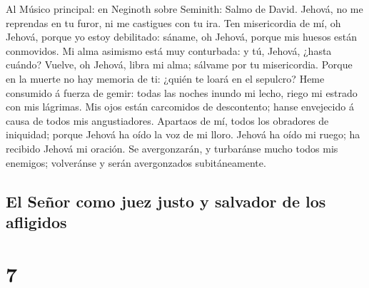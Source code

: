  Al Músico principal: en Neginoth sobre Seminith: Salmo de
David. Jehová, no me reprendas en tu furor, ni me castigues con tu ira.
 Ten misericordia de mí, oh Jehová, porque yo estoy
debilitado: sáname, oh Jehová, porque mis huesos están conmovidos.
 Mi alma asimismo está muy conturbada: y tú, Jehová,
¿hasta cuándo?  Vuelve, oh Jehová, libra mi alma; sálvame
por tu misericordia.  Porque en la muerte no hay memoria
de ti: ¿quién te loará en el sepulcro?  Heme consumido á
fuerza de gemir: todas las noches inundo mi lecho, riego mi estrado con
mis lágrimas.  Mis ojos están carcomidos de descontento;
hanse envejecido á causa de todos mis angustiadores. 
Apartaos de mí, todos los obradores de iniquidad; porque Jehová ha oído
la voz de mi lloro.  Jehová ha oído mi ruego; ha recibido
Jehová mi oración.  Se avergonzarán, y turbaránse mucho
todos mis enemigos; volveránse y serán avergonzados subitáneamente.

\hypertarget{el-seuxf1or-como-juez-justo-y-salvador-de-los-afligidos}{%
\subsection{El Señor como juez justo y salvador de los
afligidos}\label{el-seuxf1or-como-juez-justo-y-salvador-de-los-afligidos}}

\hypertarget{section-6}{%
\section{7}\label{section-6}}

